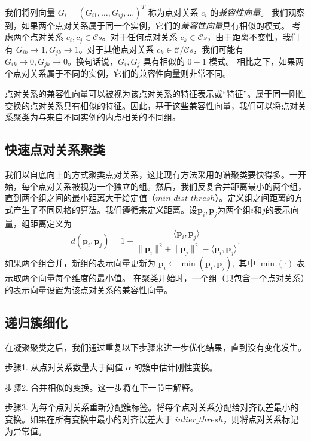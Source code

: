 我们将列向量 $G_i = (G_{i1}, \ldots , G_{ij}, \ldots)^T$ 称为点对关系 $c_i$ 的\emph{兼容性向量}。
我们观察到，如果两个点对关系属于同一个实例，它们的\emph{兼容性向量}具有相似的模式。
考虑两个点对关系 $c_i, c_j \in \mathcal{C}s$。对于任何点对关系 $c_k \in \mathcal{C}s$，由于距离不变性，我们有 $G_{ik} \rightarrow 1, G_{jk} \rightarrow 1$。对于其他点对关系 $c_k \in \mathcal{C}/\mathcal{C}s$，我们可能有 $G_{ik} \rightarrow 0, G_{jk} \rightarrow 0$。换句话说，$G_i,G_j$ 具有相似的 $0-1$ 模式。
相比之下，如果两个点对关系属于不同的实例，它们的兼容性向量则非常不同。

点对关系的兼容性向量可以被视为该点对关系的特征表示或“特征”。属于同一刚性变换的点对关系具有相似的特征。因此，基于这些兼容性向量，我们可以将点对关系聚类为与来自不同实例的内点相关的不同组。

\subsection{快速点对关系聚类}
我们以自底向上的方式聚类点对关系，这比现有方法采用的谱聚类\cite{parra2019practical}\cite{shi2021robin}要快得多。一开始，每个点对关系被视为一个独立的组。然后，我们反复合并距离最小的两个组，直到两个组之间的最小距离大于给定值（$min\_dist\_thresh$）。定义组之间距离的方式产生了不同风格的算法。我们遵循\cite{magri2014t}来定义距离。设$\boldsymbol{p}_i, \boldsymbol{p}_j$为两个组$i$和$j$的表示向量，组距离定义为
\begin{equation}
d(\boldsymbol{p}_i, \boldsymbol{p}_j)= 1-\frac{\langle \boldsymbol{p}_i,\boldsymbol{p}_j\rangle}{\parallel \boldsymbol{p}_i\parallel ^2+\parallel \boldsymbol{p}_j\parallel ^2-\langle \boldsymbol{p}_i,\boldsymbol{p}_j\rangle}.
\end{equation}
如果两个组合并，新组的表示向量更新为
$\boldsymbol{p}_i \leftarrow \min (\boldsymbol{p}_i, \boldsymbol{p}_j),$ 其中 $\min(\cdot)$ 表示取两个向量每个维度的最小值。
在聚类开始时，一个组（只包含一个点对关系）的表示向量设置为该点对关系的兼容性向量。

\subsection{递归簇细化}
\label{sec:cluster_refinement}
在凝聚聚类之后，我们通过重复以下步骤来进一步优化结果，直到没有变化发生。

步骤1. 从点对关系数量大于阈值 $\alpha$ 的簇中估计刚性变换。

步骤2. 合并相似的变换。这一步将在下一节中解释。

步骤3. 为每个点对关系重新分配簇标签。将每个点对关系分配给对齐误差最小的变换。如果在所有变换中最小的对齐误差大于 $inlier\_thresh$，则将点对关系标记为异常值。

